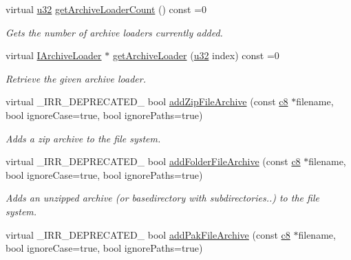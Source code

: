 \begin{DoxyCompactItemize}
\mbox{\label{classirr_1_1io_1_1IFileSystem_ae1e958f65eb8b61b40f3c71a593f852d}} 
virtual \hyperlink{namespaceirr_a0416a53257075833e7002efd0a18e804}{u32} \hyperlink{classirr_1_1io_1_1IFileSystem_ae1e958f65eb8b61b40f3c71a593f852d}{get\+Archive\+Loader\+Count} () const =0
\begin{DoxyCompactList}\small\item\em Gets the number of archive loaders currently added. \end{DoxyCompactList}\item 
virtual \hyperlink{classirr_1_1io_1_1IArchiveLoader}{I\+Archive\+Loader} $\ast$ \hyperlink{classirr_1_1io_1_1IFileSystem_a175208d74556d1a0e4fe7400bbc65d7b}{get\+Archive\+Loader} (\hyperlink{namespaceirr_a0416a53257075833e7002efd0a18e804}{u32} index) const =0
\begin{DoxyCompactList}\small\item\em Retrieve the given archive loader. \end{DoxyCompactList}\item 
virtual \+\_\+\+I\+R\+R\+\_\+\+D\+E\+P\+R\+E\+C\+A\+T\+E\+D\+\_\+ bool \hyperlink{classirr_1_1io_1_1IFileSystem_aef11ff9b5c171d7b3a99d8a79b71f2b3}{add\+Zip\+File\+Archive} (const \hyperlink{namespaceirr_a9395eaea339bcb546b319e9c96bf7410}{c8} $\ast$filename, bool ignore\+Case=true, bool ignore\+Paths=true)
\begin{DoxyCompactList}\small\item\em Adds a zip archive to the file system. \end{DoxyCompactList}\item 
virtual \+\_\+\+I\+R\+R\+\_\+\+D\+E\+P\+R\+E\+C\+A\+T\+E\+D\+\_\+ bool \hyperlink{classirr_1_1io_1_1IFileSystem_a7b5235a1473ff67d97f1487211762723}{add\+Folder\+File\+Archive} (const \hyperlink{namespaceirr_a9395eaea339bcb546b319e9c96bf7410}{c8} $\ast$filename, bool ignore\+Case=true, bool ignore\+Paths=true)
\begin{DoxyCompactList}\small\item\em Adds an unzipped archive (or basedirectory with subdirectories..) to the file system. \end{DoxyCompactList}\item 
virtual \+\_\+\+I\+R\+R\+\_\+\+D\+E\+P\+R\+E\+C\+A\+T\+E\+D\+\_\+ bool \hyperlink{classirr_1_1io_1_1IFileSystem_a5ade21d59a80b16965d57d1977ad6cc4}{add\+Pak\+File\+Archive} (const \hyperlink{namespaceirr_a9395eaea339bcb546b319e9c96bf7410}{c8} $\ast$filename, bool ignore\+Case=true, bool ignore\+Paths=true)

\end{DoxyCompactItemize}
